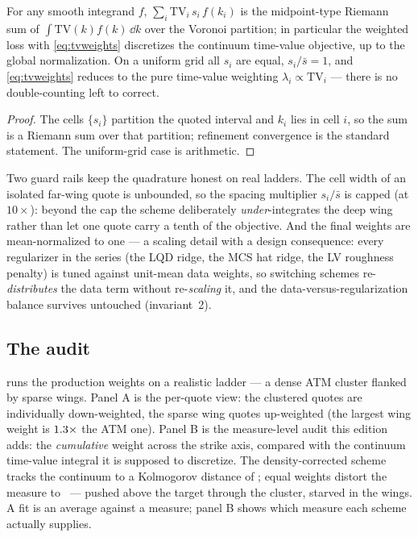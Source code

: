 \documentclass[11pt]{article}
\begin{document}
\begin{proposition}
\label{prop:quad}
For any smooth integrand $f$,
$\sum_i \mathrm{TV}_i\,s_i\,f(k_i)$ is the midpoint-type Riemann sum of
$\int \mathrm{TV}(k)f(k)\,\dd k$ over the Voronoi partition; in
particular the weighted loss with \eqref{eq:tvweights} discretizes the
continuum time-value objective, up to the global normalization.  On a
uniform grid all $s_i$ are equal, $s_i/\bar s=1$, and
\eqref{eq:tvweights} reduces to the pure time-value weighting
$\lambda_i\propto\mathrm{TV}_i$ --- there is no double-counting left to
correct.
\end{proposition}

\begin{proof}
The cells $\{s_i\}$ partition the quoted interval and $k_i$ lies in cell
$i$, so the sum is a Riemann sum over that partition; refinement
convergence is the standard statement.  The uniform-grid case is
arithmetic.
\end{proof}

Two guard rails keep the quadrature honest on real ladders.  The cell
width of an isolated far-wing quote is unbounded, so the spacing
multiplier $s_i/\bar s$ is capped (at $10\times$): beyond the cap the
scheme deliberately \emph{under}-integrates the deep wing rather than let
one quote carry a tenth of the objective.  And the final weights are
mean-normalized to one --- a scaling detail with a design consequence:
every regularizer in the series (the LQD ridge, the MCS hat ridge, the LV
roughness penalty) is tuned against unit-mean data weights, so switching
schemes re-\emph{distributes} the data term without re-\emph{scaling} it,
and the data-versus-regularization balance survives untouched
(invariant~2).

\subsection{The audit}

 runs the production weights on a realistic ladder ---
a dense ATM cluster flanked by sparse wings.  Panel A is the per-quote
view: the clustered quotes are individually down-weighted, the sparse
wing quotes up-weighted (the largest wing weight is
$1.3\times$ the ATM one).  Panel B is the measure-level audit
this edition adds: the \emph{cumulative} weight across the strike axis,
compared with the continuum time-value integral it is supposed to
discretize.  The density-corrected scheme tracks the continuum to a
Kolmogorov distance of \objmmeaserrtv; equal weights distort the measure
to \objmmeaserreq\ --- pushed above the target through the cluster,
starved in the wings.  A fit is an average against a measure; panel B
shows which measure each scheme actually supplies.
\end{document}

